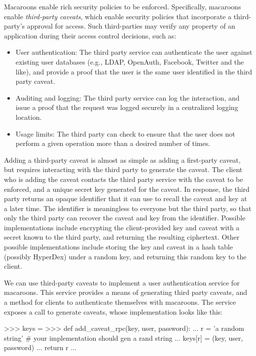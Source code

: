 Macaroons enable rich security policies to be enforced. Specifically, macaroons
enable {\em third-party caveats}, which enable security policies that
incorporate a third-party's approval for access.  Such third-parties may verify
any property of an application during their access control decisions, such as:

\begin{itemize}
    \item User authentication:  The third party service can authenticate the
        user against existing user databases (e.g., LDAP, OpenAuth, Facebook,
        Twitter and the like), and provide a proof that the user is the same
        user identified in the third party caveat.
    \item Auditing and logging:  The third party service can log the
        interaction, and issue a proof that the request was logged securely in a
        centralized logging location.
    \item Usage limits: The third party can check to ensure that the user does
        not perform a given operation more than a desired number of times.
\end{itemize}

Adding a third-party caveat is almost as simple as adding a first-party caveat,
but requires interacting with the third party to generate the caveat.  The
client who is adding the caveat contacts the third party service with the caveat
to be enforced, and a unique secret key generated for the caveat.  In response,
the third party returns an opaque identifier that it can use to recall the
caveat and key at a later time.  The identifier is meaningless to everyone but
the third party, so that only the third party can recover the caveat and key
from the identifier.  Possible implementations include encrypting the
client-provided key and caveat with a secret known to the third party, and
returning the resulting ciphertext.  Other possible implementations include
storing the key and caveat in a hash table (possibly HyperDex) under a random
key, and returning this random key to the client.

We can use third-party caveats to implement a user authentication service for
macaroons.  This service provides a means of generating third party caveats, and
a method for clients to authenticate themselves with macaroons.  The service
exposes a call to generate caveats, whose implementation looks like this:

\begin{pythoncode}
>>> keys = {}
>>> def add_caveat_rpc(key, user, password):
...     r = 'a random string' # your implementation should gen a rand string
...     keys[r] = (key, user, password)
...     return r
...
\end{pythoncode}

